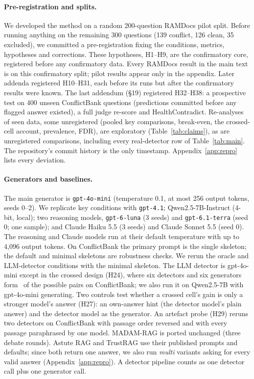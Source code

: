 \paragraph{Pre-registration and splits.}
We developed the method on a random 200-question RAMDocs pilot split. Before running anything on the remaining 300
questions (139 conflict, 126 clean, 35 excluded), we committed a pre-registration fixing the conditions, metrics,
hypotheses and corrections. These hypotheses, H1--H9, are the confirmatory core, registered before any confirmatory
data. Every RAMDocs result in the main text is on this confirmatory split; pilot results appear only in the appendix.
Later addenda registered H10--H31, each before its runs but after the confirmatory results were known. The last
addendum (\S19) registered H32--H38: a prospective test on 400 unseen ConflictBank questions (predictions committed
before any flagged answer existed), a full judge re-score and HealthContradict. Re-analyses of seen data, some
unregistered (pooled key comparisons, break-even, the crossed-cell account, prevalence, FDR), are exploratory
(Table~\ref{tab:claims}), as are unregistered comparisons, including every real-detector row of Table~\ref{tab:main}. The repository's commit history is the only timestamp. Appendix~\ref{app:repro} lists every deviation.

\paragraph{Generators and baselines.}
The main generator is \texttt{gpt-4o-mini} \citep{openai2024gpt4o} (temperature 0.1, at most 256 output tokens, seeds
0--2). We replicate key conditions with \texttt{gpt-4.1}; Qwen2.5-7B-Instruct \citep{yang2024qwen25} (4-bit, local);
two reasoning models, \texttt{gpt-6-luna} (3 seeds) and \texttt{gpt-6.1-terra} (seed 0; one sample); and
Claude Haiku 5.5 (3 seeds) and Claude Sonnet 5.5 (seed 0). The reasoning and Claude models run at their default
temperature with up to 4,096 output tokens. On ConflictBank the primary prompt is
the single skeleton; the default and minimal skeletons are robustness checks. We rerun the oracle and LLM-detector
conditions with the minimal skeleton.
The LLM detector is gpt-4o-mini except in the crossed design (H24), where six detectors and six generators form
\hTwentyFourCells\ of the possible pairs on ConflictBank; we also run it on Qwen2.5-7B with gpt-4o-mini generating. Two controls test
whether a crossed cell's gain is only a stronger model's answer (H27): an own-answer hint (the detector model's plain
answer) and the detector model as the generator. An artefact probe (H29) reruns two detectors on
ConflictBank with passage order reversed and with every passage paraphrased by one model.
MADAM-RAG \citep{wang2025madam} is ported unchanged (three debate rounds). Astute RAG \citep{wang2025astute} and
TrustRAG \citep{zhou2025trustrag} use their published prompts and defaults; since both return one answer, we also run
\emph{multi} variants asking for every valid answer (Appendix~\ref{app:repro}). A detector pipeline counts as one
detector call plus one generator call.

